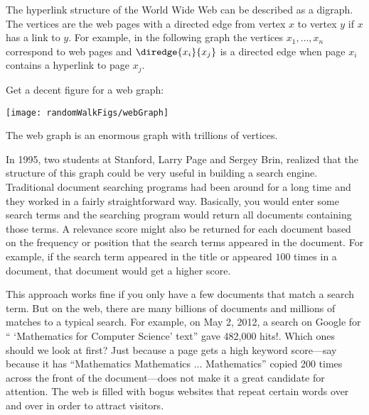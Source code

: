 \begin{editingnotes}


\end{editingnotes}

The hyperlink structure of the World Wide Web can be described as a
digraph.  The vertices are the web pages with a directed edge from vertex
$x$ to vertex $y$ if $x$ has a link to $y$.  For example, in the following
graph the vertices $x_1, \dots, x_n$ correspond to web pages and
$\diredge{x_i}{x_j}$ is a directed edge when page $x_i$ contains a
hyperlink to page $x_j$.

\begin{editingnotes}
Get a decent figure for a web graph:
\end{editingnotes}

\begin{center}
\texttt{[image: randomWalkFigs/webGraph]}
\end{center}

The web graph is an enormous graph with trillions of vertices.
\iffalse
At first glance, this graph wouldn't seem to be very interesting.  But\fi
In 1995, two students at Stanford,  Larry Page and
 Sergey Brin, realized that the structure of this
graph could be very useful in building a search engine.  Traditional
document searching programs had been around for a long time and they
worked in a fairly straightforward way.  Basically, you would enter
some search terms and the searching program would return all documents
containing those terms.  A relevance score might also be returned for
each document based on the frequency or position that the search terms
appeared in the document.  For example, if the search term appeared in
the title or appeared $100$ times in a document, that document would
get a higher score.  \iffalse
So if an author wanted a document to get a higher
score for certain keywords, he would put the keywords in the title and
make it appear in lots of places.  You can even see this today with
some bogus web sites.\fi

This approach works fine if you only have a few documents that match a
search term.  But on the web, there are many billions of documents and
millions of matches to a typical search.  For example, on May 2, 2012,
a search on Google for `` `Mathematics for Computer Science' text''
gave 482,000 hits!.  Which ones should we look at first?  Just because
a page gets a high keyword score---say because it has ``Mathematics
Mathematics $\dots$ Mathematics'' copied 200 times across the front of
the document---does not make it a great candidate for attention.  The
web is filled with bogus websites that repeat certain words over and
over in order to attract visitors.

